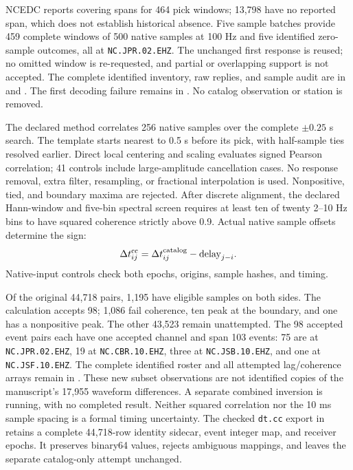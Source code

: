 NCEDC reports covering spans for 464 pick windows; 13,798 have no reported span,
which does not establish historical absence. Five sample batches provide 459
complete windows of 500 native samples at 100 Hz and five identified zero-sample
outcomes, all at \texttt{NC.JPR.02.EHZ}. The unchanged first response is reused;
no omitted window is re-requested, and partial or overlapping support is not
accepted. The complete identified inventory, raw replies, and sample audit are in
 and
.
The first decoding failure remains in
.
No catalog observation or station is removed.

The declared method correlates 256 native samples over the complete
$\pm0.25$ s search. The template starts nearest to 0.5 s before its pick,
with half-sample ties resolved earlier. Direct local centering and scaling
evaluates signed Pearson correlation; 41 controls include large-amplitude
cancellation cases. No response removal, extra filter, resampling, or
fractional interpolation is used. Nonpositive, tied, and boundary maxima
are rejected. After discrete alignment, the declared Hann-window and five-bin
spectral screen requires at least ten of twenty 2--10 Hz bins to have squared
coherence strictly above 0.9. Actual native sample offsets determine the sign:
\[
\Delta t_{ij}^{\rm cc}=\Delta t_{ij}^{\rm catalog}
                      -\mathrm{delay}_{j-i}.
\]
Native-input controls check both epochs, origins, sample hashes, and timing.

Of the original 44,718 pairs, 1,195 have eligible samples on both sides.
The calculation accepts 98; 1,086 fail coherence, ten peak at the boundary,
and one has a nonpositive peak. The other 43,523 remain unattempted.
The 98 accepted event pairs each have one accepted channel and span 103 events:
75 are at \texttt{NC.JPR.02.EHZ}, 19 at \texttt{NC.CBR.10.EHZ}, three at
\texttt{NC.JSB.10.EHZ}, and one at \texttt{NC.JSF.10.EHZ}.
The complete identified roster and all attempted lag/coherence arrays remain in
.
These new subset observations are not identified copies of the manuscript's
17,955 waveform differences. A separate combined inversion is running, with no
completed result. Neither squared
correlation nor the 10 ms sample spacing is a formal timing uncertainty.
The checked \texttt{dt.cc} export in 
retains a complete 44,718-row identity sidecar, event integer map, and receiver
epochs. It preserves binary64 values, rejects ambiguous mappings, and leaves
the separate catalog-only attempt unchanged.


